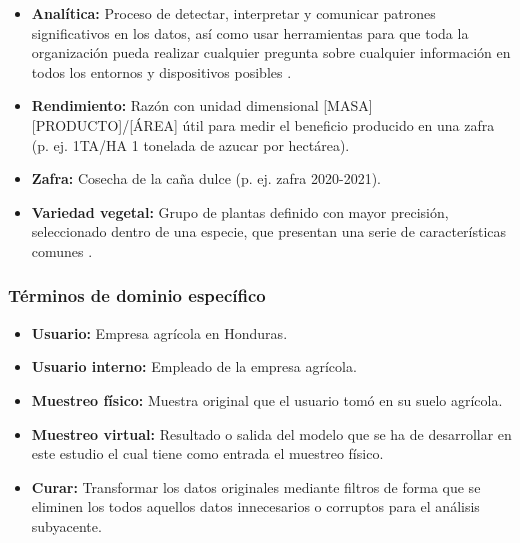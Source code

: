 \documentclass{report}
\begin{document}
\begin{itemize}
    \item \textbf{Analítica:} Proceso de detectar, interpretar y comunicar patrones significativos en los datos, así como usar herramientas para que toda la organización pueda realizar cualquier pregunta sobre cualquier información en todos los entornos y dispositivos posibles \cite{oracle-2021}.
    
    \item \textbf{Rendimiento:} Razón con unidad dimensional [MASA][PRODUCTO]/[ÁREA] útil para medir el beneficio producido en una zafra (p. ej. 1TA/HA 1 tonelada de azucar por hectárea).
    
    \item \textbf{Zafra:} Cosecha de la caña dulce (p. ej. zafra 2020-2021).
    
    \item \textbf{Variedad vegetal:} Grupo de plantas definido con mayor precisión, seleccionado dentro de una especie, que presentan una serie de características comunes \cite{union-internacional-para-la-proteccion-de-las-obtenciones-vegatales-upov-2021}.
\end{itemize}

\subsubsection{Términos de dominio específico}

\begin{itemize}
    \item \textbf{Usuario:} Empresa agrícola en Honduras.
    
    \item \textbf{Usuario interno:} Empleado de la empresa agrícola.
    
    \item \textbf{Muestreo físico:} Muestra original que el usuario tomó en su suelo agrícola.
    
    \item \textbf{Muestreo virtual:} Resultado o salida del modelo que se ha de desarrollar en este estudio el cual tiene como entrada el muestreo físico.
    
    \item \textbf{Curar:} Transformar los datos originales mediante filtros de forma que se eliminen los todos aquellos datos innecesarios o corruptos para el análisis subyacente.
\end{itemize}

\printbibliography
\end{document}
